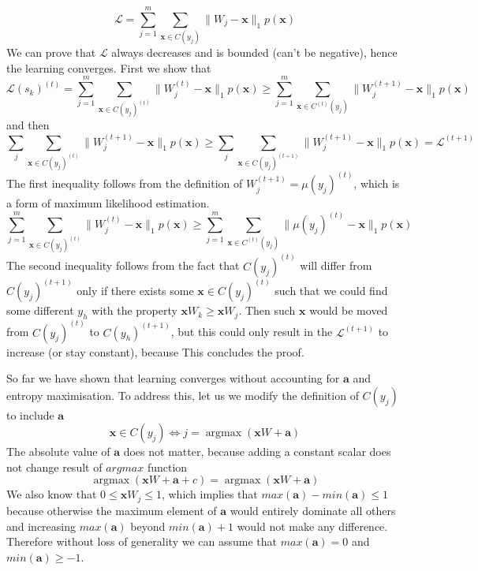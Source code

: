 \documentclass[12pt]{article}
\DeclareMathOperator*{\argmax}{argmax}
\begin{document}
\[
\mathcal{L} = \sum_{j=1}^{m} \sum_{\boldsymbol{x}\in C(y_j)} \lVert  W_j - \boldsymbol{x}\rVert_1p(\boldsymbol{x})
\]
 We can prove that $\mathcal{L}$ always decreases and is bounded (can't be negative), hence the learning converges. First we show that
\[
\mathcal{L}(s_k)^{(t)} =\sum_{j=1}^{m} \sum_{\boldsymbol{x}\in C(y_j)^{(t)}} \lVert  W_j^{(t)} - \boldsymbol{x}\rVert_1p(\boldsymbol{x})
\ge \sum_{j=1}^{m} \sum_{\boldsymbol{x}\in C^{(t)}(y_j)} \lVert  W_j^{(t+1)} - \boldsymbol{x}\rVert_1p(\boldsymbol{x})
\]
and then
\[
\sum_{j} \sum_{\boldsymbol{x}\in C(y_j)^{(t)}} \lVert W_j^{(t+1)} - \boldsymbol{x}\rVert_1 p(\boldsymbol{x}) \ge \sum_{j} \sum_{\boldsymbol{x}\in C(y_j)^{(t+1)}} \lVert W_j^{(t+1)}-\boldsymbol{x}\rVert_1 p(\boldsymbol{x}) = \mathcal{L}^{(t+1)}
\]
The first inequality follows from the definition of $W_j^{(t+1)} = \mu(y_j)^{(t)}$, which is a form of maximum likelihood estimation.
\[
\sum_{j=1}^{m} \sum_{\boldsymbol{x}\in C(y_j)^{(t)}} \lVert  W_j^{(t)} - \boldsymbol{x}\rVert_1p(\boldsymbol{x})
\ge \sum_{j=1}^{m} \sum_{\boldsymbol{x}\in C^{(t)}(y_j)} \lVert  \mu(y_j)^{(t)} - \boldsymbol{x}\rVert_1p(\boldsymbol{x})
\]
The second inequality follows from the fact that $C(y_j)^{(t)}$ will differ from $C(y_j)^{(t+1)}$ only if there exists some $\boldsymbol{x} \in C(y_j)^{(t)}$ such that we could find some different $y_h$ with the property $\boldsymbol{x} W_k \ge \boldsymbol{x} W_j$. Then such $\boldsymbol{x}$ would be moved from $C(y_j)^{(t)}$ to $C(y_h)^{(t+1)}$, but this could only result in the $\mathcal{L}^{(t+1)}$ to increase (or stay constant), because 
This concludes the proof.

So far we have shown that learning converges without accounting for $\boldsymbol{a}$ and entropy maximisation. To address this, let us we modify the definition of $C(y_j)$ to include $\boldsymbol{a}$ 
\[
\boldsymbol{x} \in C(y_j) \iff  j = \argmax(\boldsymbol{x} W + \boldsymbol{a})
\]
The absolute value of $\boldsymbol{a}$ does not matter, because adding a constant scalar does not change result of $argmax$ function  
\[
\argmax(\boldsymbol{x} W + \boldsymbol{a} + c)  = \argmax(\boldsymbol{x} W + \boldsymbol{a} )
\]
We also know that $0 \le \boldsymbol{x} W_j \le 1$, which implies that $max(\boldsymbol{a})-min(\boldsymbol{a})\le 1$ because otherwise the maximum element of $\boldsymbol{a}$ would entirely dominate all others and increasing $max(\boldsymbol{a})$ beyond $min(\boldsymbol{a})+1$ would not make any difference. Therefore without loss of generality we can assume that $max(\boldsymbol{a})=0$ and $min(\boldsymbol{a})\ge -1$.
\end{document}
